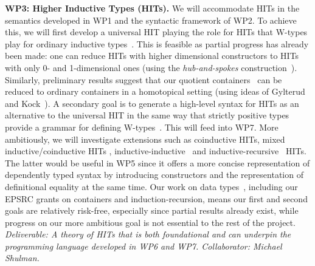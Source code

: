\documentclass[a4paper,11pt]{article}
\begin{document}


{\bf WP3: Higher Inductive Types (HITs).}  We will accommodate HITs in
the semantics developed in WP1 and the syntactic framework of WP2. To
achieve this, we will first develop a universal HIT playing the role for
HITs that W-types play for ordinary inductive
types~\cite{alti:cont-tcs}. This is feasible as partial progress has
already been made: one can reduce HITs with higher dimensional
constructors to HITs with only 0- and 1-dimensional ones (using the
\emph{hub-and-spokes} construction~\cite{hott-book}).
Similarly, preliminary results suggest that our quotient
containers~\cite{alti:mpc04} can be reduced
to ordinary containers in a homotopical setting 
(using ideas of Gylterud~\cite{gylterud:thesis} and
Kock~\cite{kock:groupoids}).
%
A secondary goal is to generate a high-level syntax for HITs as
an alternative to the universal HIT in the same way that strictly
positive types provide a grammar for defining 
W-types~\cite{alti:cont-tcs}.  This will feed into WP7.
More ambitiously, we will %
investigate extensions such as coinductive HITs, mixed
inductive/coinductive HITs \cite{txa:mpc2010g}, 
inductive-inductive~\cite{alti:catind2} and
inductive-recursive~\cite{DS:indrec,ghani:fibredIR} HITs. The latter would be useful
in WP5 since it offers a more concise representation of dependently
typed syntax by introducing
constructors and the representation of definitional equality at the
same time.
Our work on data
types~\cite{alti:cont-tcs,
altenkirchGhaniHancockMcBrideMorris:indexedContainers,
alti:catind2,ghani:fibredIR,GambinoN:polfpm,awodeyGamSoja:indTypesInHTT},
including our EPSRC grants on containers and induction-recursion, means
our first and second goals
are relatively risk-free,
especially since partial results already exist, 
while progress on our more ambitious goal 
is not essential to the rest of the project. {\em Deliverable: A
  theory of HITs that is both foundational and can underpin the
  programming language developed in WP6 and WP7. 
Collaborator: Michael Shulman. 
}
\end{document}
